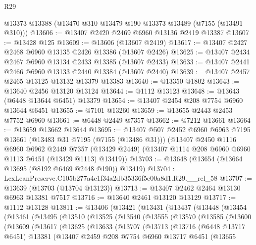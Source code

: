 \begin{lexlean}{R29}
\begin{coremodule}
    @13373
    @13388
    (@13470 @310 @13479 @190 @13373 @13489 (@7155 (@13491 @310)))
@13606 := @13407 @2420 @2469 @6960 @13136 @2419 @13387
@13607 := @13428 @125
@13609 := @13606 (@13607 @2419)
@13617 := @13407 @2427 @2468 @6960 @13135 @2426 @13386 (@13607 @2426)
@13625 := @13407 @2434 @2467 @6960 @13134 @2433 @13385 (@13607 @2433)
@13633 := @13407 @2441 @2466 @6960 @13133 @2440 @13384 (@13607 @2440)
@13639 := @13407 @2457 @2465 @13125 @13132 @13379 @13383
@13640 := @13350 @1802
@13643 := @13640 @2456 @13120 @13124
@13644 := @1112 @13123
@13648 := @13643 (@6448 @13644 @6451) @13379
@13654 := @13407 @2454 @208 @7754 @6960 @13644 @6451
@13655 := @7101 @13260
@13659 := @13655 @2443 @2453 @7752 @6960
@13661 := @6448 @2449 @7357
@13662 := @7212 @13661
@13664 := @13659 @13662 @13644
@13695 := @13407
    @507
    @2452
    @6960
    @6963
    @7195
    @13661
    (@13483 @31 @7195 (@7155 (@13486 @31)))
    (@13407
      @2450
      @1116
      @6960
      @6962
      @2449
      @7357
      (@13429 @2449)
      (@13407 @1114 @208 @6960 @6960 @1113 @6451 (@13429 @1113) @13419))
@13703 := @13648 (@13654 (@13664 @13695 (@8192 @6469 @2448 @190)) @13419)
@13704 := LexLeanPreserve.C105b277a4c1f34a2db35336f5e00a8d1.R29.__rel_58
@13707 := @13639 (@13703 (@13704 @13123))
@13713 := @13407 @2462 @2464 @13130 @6963 @13381 @7517
@13716 := @13640 @2461 @13120 @13129
@13717 := @1112 @13128
@13811 := @13406
    (@13421
      (@13431
        (@13437
          (@13448
            (@13454
              (@13461
                (@13495
                  (@13510
                    (@13525
                      (@13540
                        (@13555
                          (@13570
                            (@13585
                              (@13600
                                (@13609
                                  (@13617
                                    (@13625
                                      (@13633
                                        (@13707
                                          (@13713
                                            (@13716
                                              (@6448 @13717 @6451)
                                              @13381
                                              (@13407
                                                @2459
                                                @208
                                                @7754
                                                @6960
                                                @13717
                                                @6451
                                                (@13655

\end{coremodule}
\end{lexlean}
